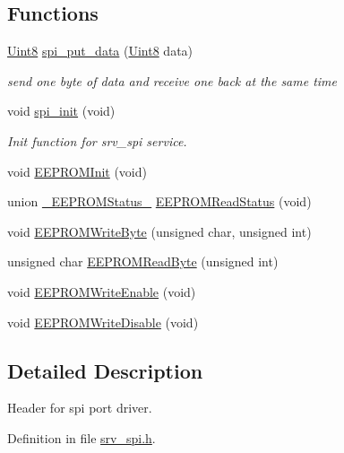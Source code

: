 \subsection*{Functions}
\begin{DoxyCompactItemize}
\item 
\hyperlink{a00072_af84840501dec18061d18a68c162a8fa2}{Uint8} \hyperlink{a00013_a19e2dff580e4d1b2198fa9108fca81ac}{spi\+\_\+put\+\_\+data} (\hyperlink{a00072_af84840501dec18061d18a68c162a8fa2}{Uint8} data)
\begin{DoxyCompactList}\small\item\em send one byte of data and receive one back at the same time \end{DoxyCompactList}\item 
void \hyperlink{a00013_ae909944aa85ae98323073c628be541aa}{spi\+\_\+init} (void)
\begin{DoxyCompactList}\small\item\em Init function for srv\+\_\+spi service. \end{DoxyCompactList}\item 
void \hyperlink{a00013_a507081b071417d4dacd038af0d0e4c25}{E\+E\+P\+R\+O\+M\+Init} (void)
\item 
union \hyperlink{a00013_db/df8/a00076}{\+\_\+\+E\+E\+P\+R\+O\+M\+Status\+\_\+} \hyperlink{a00013_a737bfe55bdc73b84f3fd5565c6baca2a}{E\+E\+P\+R\+O\+M\+Read\+Status} (void)
\item 
void \hyperlink{a00013_ab651dc76a73eff7c347344cc8b5b0b21}{E\+E\+P\+R\+O\+M\+Write\+Byte} (unsigned char, unsigned int)
\item 
unsigned char \hyperlink{a00013_a35883bb981f7b74f38bed25512568081}{E\+E\+P\+R\+O\+M\+Read\+Byte} (unsigned int)
\item 
void \hyperlink{a00013_a615f233da8f99248295e6ea727d93bde}{E\+E\+P\+R\+O\+M\+Write\+Enable} (void)
\item 
void \hyperlink{a00013_a985b143808edb68aca9c4dabc7af959d}{E\+E\+P\+R\+O\+M\+Write\+Disable} (void)
\end{DoxyCompactItemize}


\subsection{Detailed Description}
Header for spi port driver. 



Definition in file \hyperlink{a00013_source}{srv\+\_\+spi.\+h}.



